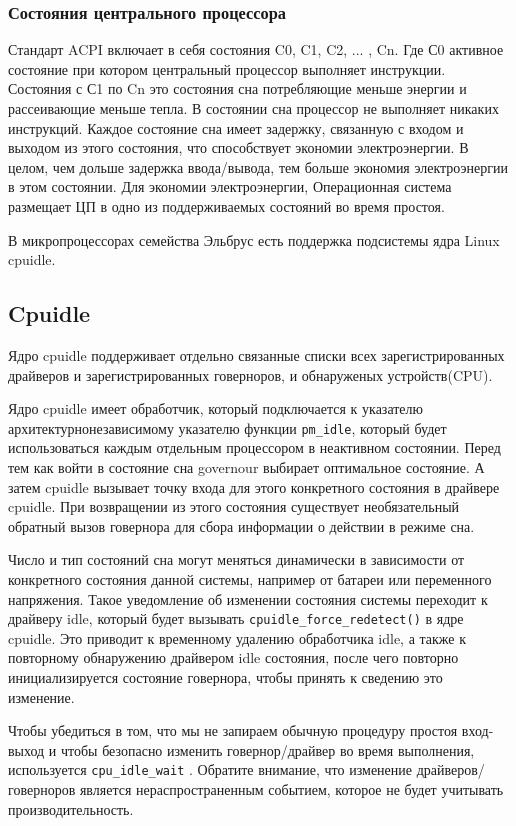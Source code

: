 \documentclass{article}
\begin{document}
\subsubsection{Состояния центрального процессора}

Стандарт ACPI включает в себя состояния C0, C1, C2, ... , Cn. Где С0 активное состояние при котором центральный процессор выполняет инструкции. Состояния с С1 по Cn это состояния сна потребляющие меньше энергии и рассеивающие меньше тепла. В состоянии сна процессор не выполняет никаких инструкций. Каждое состояние сна имеет задержку, связанную с входом и выходом из этого состояния, что способствует экономии электроэнергии. В целом, чем дольше задержка ввода/вывода, тем больше экономия электроэнергии в этом состоянии. Для экономии электроэнергии, Операционная система размещает ЦП в одно из поддерживаемых состояний во время простоя.

В микропроцессорах семейства Эльбрус есть поддержка подсистемы ядра Linux cpuidle.


\subsection{Cpuidle}
Ядро cpuidle поддерживает отдельно связанные списки всех зарегистрированных драйверов и зарегистрированных говерноров, и обнаруженых устройств(CPU).

Ядро cpuidle имеет обработчик, который подключается к указателю архитектурнонезависимому указателю функции \texttt{pm\_idle}, который будет использоваться каждым отдельным процессором в неактивном состоянии. Перед тем как войти в состояние сна governour выбирает оптимальное состояние. А затем cpuidle вызывает точку входа для этого конкретного состояния в драйвере cpuidle. При возвращении из этого состояния существует необязательный обратный вызов говернора для сбора информации о действии в режиме сна.

Число и тип состояний сна могут меняться динамически в зависимости от конкретного состояния данной системы, например от батареи или переменного напряжения. Такое уведомление об изменении состояния системы переходит к драйверу idle, который будет вызывать 
\texttt{cpuidle\_force\_redetect()} в ядре cpuidle. Это приводит к временному удалению обработчика idle, а также к повторному обнаружению драйвером idle состояния, после чего повторно инициализируется состояние говернора, чтобы принять к сведению это изменение.

Чтобы убедиться в том, что мы не запираем обычную процедуру простоя вход-выход и чтобы безопасно изменить говернор/драйвер во время выполнения, используется \texttt{cpu\_idle\_wait} . Обратите внимание, что изменение драйверов/говерноров является нераспространенным событием, которое не будет учитывать производительность.
\end{document}
